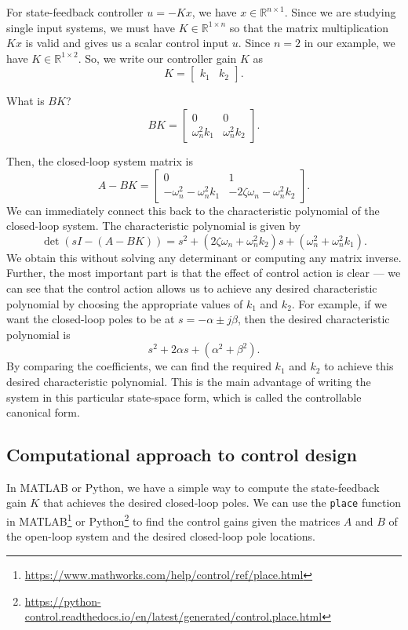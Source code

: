 \documentclass{ee122_notes}
\begin{document}
For state-feedback controller $u = -Kx$, we have $x \in \mathbb{R}^{n \times 1}$. Since we are studying single input systems, we must have $K \in \mathbb{R}^{1 \times n}$ so that the matrix multiplication $Kx$ is valid and gives us a scalar control input $u$. Since $n = 2$ in our example, we have $K \in \mathbb{R}^{1 \times 2}$. So, we write our controller gain $K$ as 
\[
K = \begin{bmatrix}k_1 & k_2\end{bmatrix}.
\]
\begin{popquiz}
What is $BK$?
\popqsplit
\[
BK = \begin{bmatrix}0 & 0\\
\omega_n^2 k_1 & \omega_n^2 k_2\end{bmatrix}.
\]
\end{popquiz}
Then, the closed-loop system matrix is
\[
A - BK = \begin{bmatrix}0 & 1\\
-\omega_n^2 - \omega_n^2 k_1 & -2\zeta \omega_n - \omega_n^2 k_2\end{bmatrix}.
\]
We can immediately connect this back to the characteristic polynomial of the closed-loop system. The characteristic polynomial is given by
\[
\det(sI - (A - BK)) = s^2 + (2\zeta \omega_n + \omega_n^2 k_2)s + (\omega_n^2 + \omega_n^2 k_1).
\]
We obtain this without solving any determinant or computing any matrix inverse. Further, the most important part is that the effect of control action is clear --- we can see that the control action allows us to achieve any desired characteristic polynomial by choosing the appropriate values of $k_1$ and $k_2$. For example, if we want the closed-loop poles to be at $s = -\alpha \pm j\beta$, then the desired characteristic polynomial is
\[
s^2 + 2\alpha s + (\alpha^2 + \beta^2).
\]
By comparing the coefficients, we can find the required $k_1$ and $k_2$ to achieve this desired characteristic polynomial. This is the main advantage of writing the system in this particular state-space form, which is called the controllable canonical form. 
\subsection{Computational approach to control design}
In MATLAB or Python, we have a simple way to compute the state-feedback gain $K$ that achieves the desired closed-loop poles. We can use the \texttt{place} function in MATLAB\footnote{\url{https://www.mathworks.com/help/control/ref/place.html}} or Python\footnote{\url{https://python-control.readthedocs.io/en/latest/generated/control.place.html}} to find the control gains given the matrices $A$ and $B$ of the open-loop system and the desired closed-loop pole locations. 
\end{document}
